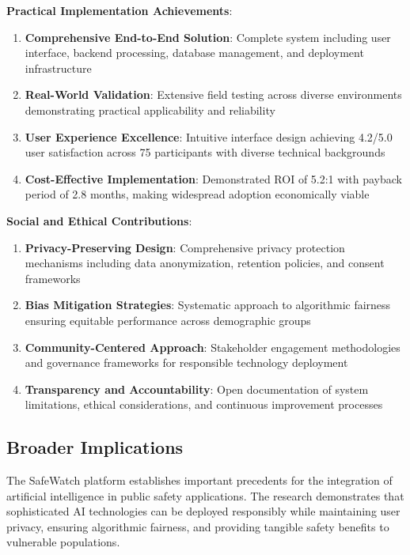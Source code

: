 \documentclass[12pt,a4paper]{article}
\begin{document}
\textbf{Practical Implementation Achievements}:
\begin{enumerate}
    \item \textbf{Comprehensive End-to-End Solution}: Complete system including user interface, backend processing, database management, and deployment infrastructure
    \item \textbf{Real-World Validation}: Extensive field testing across diverse environments demonstrating practical applicability and reliability
    \item \textbf{User Experience Excellence}: Intuitive interface design achieving 4.2/5.0 user satisfaction across 75 participants with diverse technical backgrounds
    \item \textbf{Cost-Effective Implementation}: Demonstrated ROI of 5.2:1 with payback period of 2.8 months, making widespread adoption economically viable
\end{enumerate}

\textbf{Social and Ethical Contributions}:
\begin{enumerate}
    \item \textbf{Privacy-Preserving Design}: Comprehensive privacy protection mechanisms including data anonymization, retention policies, and consent frameworks
    \item \textbf{Bias Mitigation Strategies}: Systematic approach to algorithmic fairness ensuring equitable performance across demographic groups
    \item \textbf{Community-Centered Approach}: Stakeholder engagement methodologies and governance frameworks for responsible technology deployment
    \item \textbf{Transparency and Accountability}: Open documentation of system limitations, ethical considerations, and continuous improvement processes
\end{enumerate}

\subsection{Broader Implications}

The SafeWatch platform establishes important precedents for the integration of artificial intelligence in public safety applications. The research demonstrates that sophisticated AI technologies can be deployed responsibly while maintaining user privacy, ensuring algorithmic fairness, and providing tangible safety benefits to vulnerable populations.
\end{document}
